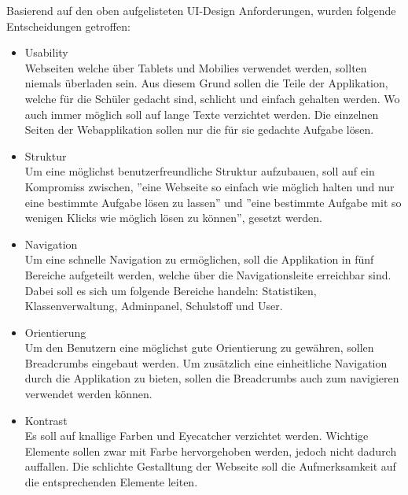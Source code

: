 Basierend auf den oben aufgelisteten UI-Design Anforderungen, wurden folgende Entscheidungen getroffen:

\begin{itemize}
	\item Usability \\
		Webseiten welche über Tablets und Mobilies verwendet werden, sollten niemals überladen sein. Aus diesem Grund sollen die Teile der Applikation, welche für die Schüler gedacht sind, schlicht und einfach gehalten werden. Wo auch immer möglich soll auf lange Texte verzichtet werden. Die einzelnen Seiten der Webapplikation sollen nur die für sie gedachte Aufgabe lösen.
		
		
	\item Struktur \\
		Um eine möglichst benutzerfreundliche Struktur aufzubauen, soll auf ein Kompromiss zwischen, ''eine Webseite so einfach wie möglich halten und nur eine bestimmte Aufgabe lösen zu lassen'' und ''eine bestimmte Aufgabe mit so wenigen Klicks wie möglich lösen zu können'', gesetzt werden. \\
		
	\item Navigation \\
		Um eine schnelle Navigation zu ermöglichen, soll die Applikation in fünf Bereiche aufgeteilt werden, welche über die Navigationsleite erreichbar sind. Dabei soll es sich um folgende Bereiche handeln: Statistiken, Klassenverwaltung, Adminpanel, Schulstoff und User. 
		
	\item Orientierung \\
		Um den Benutzern eine möglichst gute Orientierung zu gewähren, sollen Breadcrumbs eingebaut werden. Um zusätzlich eine einheitliche Navigation durch die Applikation zu bieten, sollen die Breadcrumbs auch zum navigieren verwendet werden können.
		
	\item Kontrast \\
		Es soll auf knallige Farben und Eye­cat­cher verzichtet werden. Wichtige Elemente sollen zwar mit Farbe hervorgehoben werden, jedoch nicht dadurch auffallen. Die schlichte Gestalltung der Webseite soll die Aufmerksamkeit auf die entsprechenden Elemente leiten.
\end{itemize}


